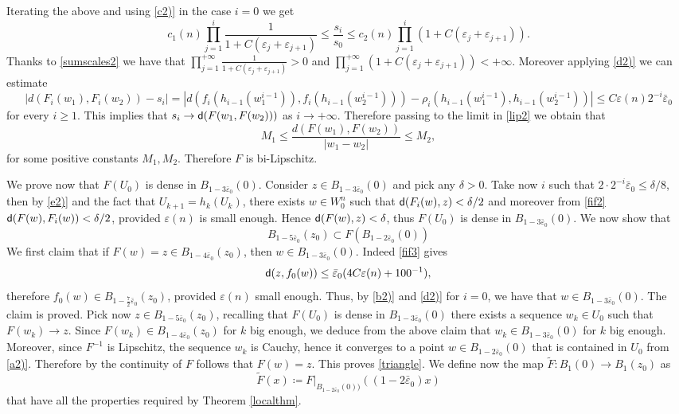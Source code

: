 \documentclass[11pt]{article}
\newcommand{\eps}{\varepsilon}
\newcommand{\sfd}{{\sf d}}
\theoremstyle{plain}
\theoremstyle{definition}
\numberwithin{equation}{section}
\begin{document}
Iterating the above and using \ref{c2)} in the case $i=0$ we get
\begin{equation}	\label{lip2}
 c_1(n)\prod_{j=1}^i\frac{1}{1+C(\eps_j+\eps_{j+1})}\le \frac{s_i}{s_0}\le  c_2(n)\prod_{j=1}^i(1+C(\eps_j+\eps_{j+1})).
\end{equation} 
Thanks to \eqref{sumscales2} we have that $\prod_{j=1}^{+\infty}\frac{1}{1+C(\eps_j+\eps_{j+1})}>0$ and $\prod_{j=1}^{+\infty}(1+C(\eps_j+\eps_{j+1}))<+\infty.$ 
Moreover applying \ref{d2)} we can estimate
\begin{equation}\label{rofi2}
|d(F_i(w_1),F_i(w_2))-s_i|=|d(f_i(h_{i-1}(w_1^{i-1})),f_i(h_{i-1}(w_2^{i-1})))-\rho_i(h_{i-1}(w_1^{i-1}),h_{i-1}(w_2^{i-1}))|\le C \eps(n)2^{-i}\bar \eps_0
\end{equation}
for every $i\ge 1$. This implies that $s_i \to \sfd(F(w_1,F(w_2)))$ as $i \to +\infty.$ Therefore passing to the limit in \eqref{lip2} we obtain that 
\[M_1\le \frac{d(F(w_1),F(w_2))}{|w_1-w_2|}\le M_2,\]
for some positive constants $M_1,M_2$.
Therefore $F$ is bi-Lipschitz.
\medskip


We prove now that $F(U_0)$ is dense in $B_{1-3\bar \eps_0}(0)$. Consider $z \in B_{1-3\bar \eps_0}(0)$ and pick any $\delta>0.$ 	
Take now $i$ such that $2\cdot 2^{-i}\bar \eps_0\le \delta/8$, then by \ref{e2)} and the fact that $U_{k+1}=h_k(U_k)$, there exists $w \in W_0^n$ such that $\sfd(F_i(w),z)< \delta/2$ and moreover from \eqref{fif2} $\sfd(F(w),F_i(w))<  \delta/2$, provided $\eps(n)$ is small enough. Hence $\sfd(F(w),z)<  \delta$, thus $F(U_0)$ is dense in $B_{1-3\bar \eps_0}(0).$ We now show that
\begin{equation}\label{triangle}
B_{1-5\bar \eps_0}(z_0)\subset F(B_{1-2\bar \eps_0}(0))
\end{equation}
We first claim that if $F(w)=z \in B_{1-4\bar \eps_0}(z_0)$, then $w \in B_{1-3\bar \eps_0}(0).$ Indeed \eqref{fif3} gives
\[ \sfd(z,f_0(w))\le  \bar \eps_0 (4C\eps(n)+100^{-1}),\]
therefore $f_0(w) \in B_{1-\frac{7}{2}\bar \eps_0}(z_0)$, provided $\eps(n)$ small enough. Thus, by \ref{b2)} and \ref{d2)} for  $i=0$, we have that $w \in  B_{1-3\bar \eps_0}(0)$. The claim is proved. Pick now $z \in B_{1-5\bar \eps_0}(z_0)$, recalling  that $F(U_0)$ is dense in $B_{1-3\bar \eps_0}(0)$ there exists a sequence $w_k \in U_0$ such that $F(w_k)\to z.$ Since $F(w_k) \in B_{1-4\bar \eps_0}(z_0)$ for $k$ big enough, we deduce from the above claim that $w_k \in B_{1-3\bar \eps_0}(0)$ for $k$ big enough. Moreover, since $F^{-1}$ is Lipschitz, the sequence $w_k$ is Cauchy, hence it converges to a point $w \in B_{1-2\bar \eps_0}(0)$ that is contained in $U_0$ from \ref{a2)}. Therefore by the continuity of $F$ follows that $F(w)=z.$ This proves \eqref{triangle}. 
 We define now the map  $\tilde F : B_1(0)\to B_1(z_0)$ as
\[\tilde F(x)\coloneqq  F|_{B_{1-2\bar \eps_0}(0))}((1-2\bar \eps_0)x)\]
that have all the properties required by Theorem \ref{localthm}.\\
\end{document}
